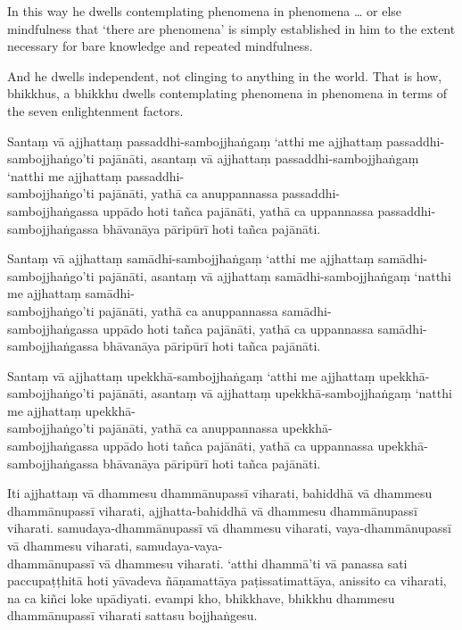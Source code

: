 \enlargethispage{2\baselineskip}

In this way he dwells contemplating phenomena in phenomena \ldots{} or else
mindfulness that ‘there are phenomena’ is simply established in him to the
extent necessary for bare knowledge and repeated mindfulness.

And he dwells independent, not clinging to anything in the world. That is how,
bhikkhus, a bhikkhu dwells contemplating phenomena in phenomena in terms of the
seven enlightenment factors.


\paliPage

Santaṃ vā ajjhattaṃ passaddhi-sambojjhaṅgaṃ ‘atthi me ajjhattaṃ passaddhi-sambojjhaṅgo’ti pajānāti,
asantaṃ vā ajjhattaṃ passaddhi-sambojjhaṅgaṃ ‘natthi me ajjhattaṃ passaddhi-\\ sambojjhaṅgo’ti pajānāti,
yathā ca anuppannassa passaddhi-\\ sambojjhaṅgassa uppādo hoti tañca pajānāti,
yathā ca uppannassa passaddhi-sambojjhaṅgassa bhāvanāya pāripūrī hoti tañca pajānāti.

Santaṃ vā ajjhattaṃ samādhi-sambojjhaṅgaṃ ‘atthi me ajjhattaṃ samādhi-sambojjhaṅgo’ti pajānāti,
asantaṃ vā ajjhattaṃ samādhi-sambojjhaṅgaṃ ‘natthi me ajjhattaṃ samādhi-\\ sambojjhaṅgo’ti pajānāti,
yathā ca anuppannassa samādhi-\\ sambojjhaṅgassa uppādo hoti tañca pajānāti,
yathā ca uppannassa samādhi-sambojjhaṅgassa bhāvanāya pāripūrī hoti tañca pajānāti.

Santaṃ vā ajjhattaṃ upekkhā-sambojjhaṅgaṃ ‘atthi me ajjhattaṃ upekkhā-sambojjhaṅgo’ti pajānāti,
asantaṃ vā ajjhattaṃ upekkhā-sambojjhaṅgaṃ ‘natthi me ajjhattaṃ upekkhā-\\ sambojjhaṅgo’ti pajānāti,
yathā ca anuppannassa upekkhā-\\ sambojjhaṅgassa uppādo hoti tañca pajānāti,
yathā ca uppannassa upekkhā-sambojjhaṅgassa bhāvanāya pāripūrī hoti tañca pajānāti.

Iti ajjhattaṃ vā dhammesu dhammānupassī viharati,
bahiddhā vā dhammesu dhammānupassī viharati,
ajjhatta-bahiddhā vā dhammesu dhammānupassī viharati.
samudaya-dhammānupassī vā dhammesu viharati,
vaya-dhammānupassī vā dhammesu viharati,
samudaya-vaya-\\ dhammānupassī vā dhammesu viharati.
‘atthi dhammā’ti vā panassa sati paccupaṭṭhitā hoti
yāvadeva ñāṇamattāya paṭissatimattāya, anissito ca viharati,
na ca kiñci loke upādiyati. evampi kho, bhikkhave, bhikkhu
dhammesu dhammānupassī viharati sattasu bojjhaṅgesu.

